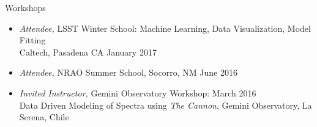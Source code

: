 \documentclass{resume} %
\begin{document}

\begin{rSection}{Workshops}

  \begin{itemize}
    \item
      \emph{Attendee,} LSST Winter School: Machine Learning, Data Visualization, Model Fitting \\
      Caltech, Pasadena CA \hfill January 2017

    \item
      \emph{Attendee,} NRAO Summer School, Socorro, NM \hfill June 2016 
    \item 
      \emph{Invited Instructor,} Gemini Observatory Workshop: \hfill March 2016 \\
      Data Driven Modeling of Spectra using \emph{The Cannon}, Gemini Observatory, La Serena, Chile 

  \end{itemize}


\end{rSection}


\end{document}
